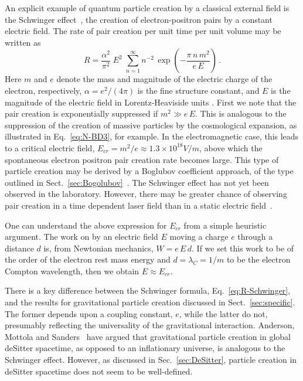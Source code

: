 \documentclass[eqsecnum,floats,aps,prd,floatfix,titlepage,tightenlines]{revtex4}
\begin{document}
An explicit example of quantum particle creation by a classical external field is the Schwinger effect~\cite{Schwinger},
the creation of electron-positron pairs by a constant electric field. The rate of pair creation per unit time per unit 
volume may be written as
\begin{equation}
R = \frac{\alpha^2}{\pi^2}\; E^2\; \sum_{n=1}^\infty n^{-2}\, \exp\left(-\frac{\pi\, n\, m^2}{e\, E} \right)\,.
\label{eq:R-Schwinger} 
 \end{equation}
Here $m$ and $e$ denote the mass and magnitude of the electric charge of the electron, respectively, $\alpha = e^2/(4 \pi)$ is the fine structure
constant, and $E$ is the magnitude of the electric field in Lorentz-Heaviside units . First we note that the pair creation is exponentially suppressed if $m^2 \gg e\, E$.
This is analogous to the suppression of the creation of massive particles by the cosmological expansion, as illustrated in Eq.~\eqref{eq:N-BD3},
for example.  In the electromagnetic case, this leads to a critical electric field, $E_{cr} = m^2/e \approx  1.3 \times 10^{18} V/m$, above which the spontaneous 
electron positron pair  creation rate becomes large. This type of particle creation may be derived by a Boglubov coefficient approach, of the type outlined in
Sect.~\ref{sec:Bogolubov}~\cite{Grib94}. The Schwinger effect has not yet been observed in the laboratory. However, there may be greater chance of
observing pair  creation in a time dependent laser field than in a static electric field~\cite{Dunne09}.

One can understand the above expression for $E_{cr}$ from a simple heuristic argument. The work on by an electric field $E$ moving a charge
$e$ through a distance $d$ is, from Newtonian mechanics, $W = e\, E\, d$. If we set this work to be of the order of the electron rest mass energy
and $d =\lambda_C = 1/m$ to be the electron Compton wavelength, then we obtain $E\approx E_{cr}$.

There is a key difference between the Schwinger formula, Eq.~\eqref{eq:R-Schwinger}, and the results for gravitational particle creation discussed
in Sect.~\ref{sec:specific}. The former depends upon a coupling constant, $e$, while the latter do not, presumably reflecting the universality of the
gravitational  interaction. Anderson, Mottola and Sanders~\cite{AM14,AMS18}   have argued that gravitational particle creation in global deSitter spacetime, 
as opposed to an inflationary universe, is analogous to the Schwinger effect. However, as discussed in Sec.~\ref{sec:DeSitter}, particle creation in  
deSitter spacetime does not seem to be well-defined.
 
\end{document}
